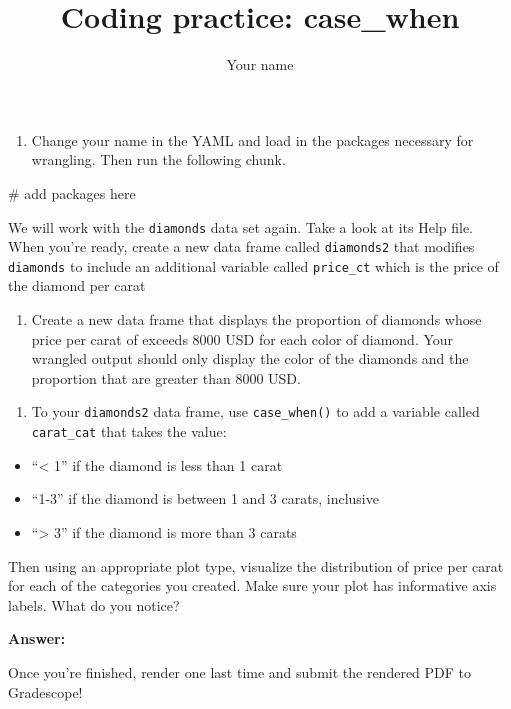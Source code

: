 \documentclass[
  letterpaper,
  DIV=11,
  numbers=noendperiod]{scrartcl}
\title{Coding practice: case\_when}
\author{Your name}
\date{}
\newenvironment{Shaded}{\begin{snugshade}}{\end{snugshade}}
\newcommand{\CommentTok}[1]{\textcolor[rgb]{0.37,0.37,0.37}{#1}}
\providecommand{\tightlist}{%
  \setlength{\itemsep}{0pt}\setlength{\parskip}{0pt}}
\begin{document}
\maketitle


\begin{enumerate}
\def\labelenumi{\arabic{enumi}.}
\setcounter{enumi}{-1}
\tightlist
\item
  Change your name in the YAML and load in the packages necessary for
  wrangling. Then run the following chunk.
\end{enumerate}

\begin{Shaded}
\begin{Highlighting}[]
\CommentTok{\# add packages here}
\end{Highlighting}
\end{Shaded}

We will work with the \texttt{diamonds} data set again. Take a look at
its Help file. When you're ready, create a new data frame called
\texttt{diamonds2} that modifies \texttt{diamonds} to include an
additional variable called \texttt{price\_ct} which is the price of the
diamond per carat

\begin{enumerate}
\def\labelenumi{\arabic{enumi}.}
\setcounter{enumi}{1}
\tightlist
\item
  Create a new data frame that displays the proportion of diamonds whose
  price per carat of exceeds 8000 USD for each color of diamond. Your
  wrangled output should only display the color of the diamonds and the
  proportion that are greater than 8000 USD.
\end{enumerate}

\begin{enumerate}
\def\labelenumi{\arabic{enumi}.}
\setcounter{enumi}{2}
\tightlist
\item
  To your \texttt{diamonds2} data frame, use \texttt{case\_when()} to
  add a variable called \texttt{carat\_cat} that takes the value:
\end{enumerate}

\begin{itemize}
\tightlist
\item
  ``\textless{} 1'' if the diamond is less than 1 carat
\item
  ``1-3'' if the diamond is between 1 and 3 carats, inclusive
\item
  ``\textgreater{} 3'' if the diamond is more than 3 carats
\end{itemize}

Then using an appropriate plot type, visualize the distribution of price
per carat for each of the categories you created. Make sure your plot
has informative axis labels. What do you notice?

\textbf{Answer:}

Once you're finished, render one last time and submit the rendered PDF
to Gradescope!
\end{document}
